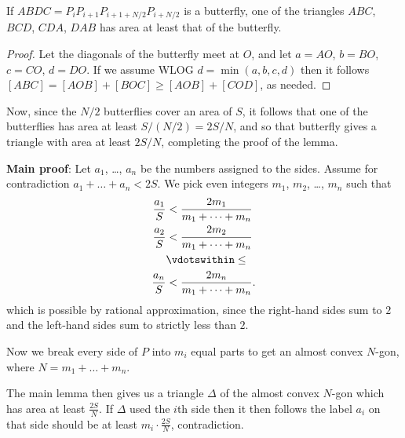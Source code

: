 \documentclass[11pt]{scrartcl}
\begin{document}
\begin{claim*}
  If $ABDC = P_i P_{i+1} P_{i+1+N/2} P_{i+N/2}$ is a butterfly,
  one of the triangles $ABC$, $BCD$, $CDA$, $DAB$
  has area at least that of the butterfly.
\end{claim*}
\begin{proof}
  Let the diagonals of the butterfly meet at $O$,
  and let $a = AO$, $b = BO$, $c = CO$, $d = DO$.
  If we assume WLOG $d = \min(a,b,c,d)$
  then it follows $[ABC] = [AOB] + [BOC] \ge [AOB] + [COD]$, as needed.
\end{proof}

Now, since the $N/2$ butterflies cover an area of $S$,
it follows that one of the butterflies
has area at least $S / (N/2) = 2S/N$,
and so that butterfly gives a triangle with area at least $2S/N$,
completing the proof of the lemma.

\bigskip

\textbf{Main proof}:
Let $a_1$, \dots, $a_n$ be the numbers assigned to the sides.
Assume for contradiction $a_1 + \dots + a_n < 2S$.
We pick even integers $m_1$, $m_2$, \dots, $m_n$ such that
\begin{align*}
  \frac{a_1}{S} &< \frac{2m_1}{m_1 + \dots + m_n} \\
  \frac{a_2}{S} &< \frac{2m_2}{m_1 + \dots + m_n} \\
  &\vdotswithin\le \\
  \frac{a_n}{S} &< \frac{2m_n}{m_1 + \dots + m_n}.
\end{align*}
which is possible by rational approximation,
since the right-hand sides sum to $2$
and the left-hand sides sum to strictly less than $2$.

Now we break every side of $P$ into $m_i$ equal parts
to get an almost convex $N$-gon, where
$N = m_1 + \dots + m_n$.

The main lemma then gives us a triangle $\Delta$
of the almost convex $N$-gon
which has area at least $\frac{2S}{N}$.
If $\Delta$ used the $i$th side
then it then follows the label $a_i$ on that side should be
at least $m_i \cdot \frac{2S}{N}$, contradiction.
\pagebreak
\end{document}
